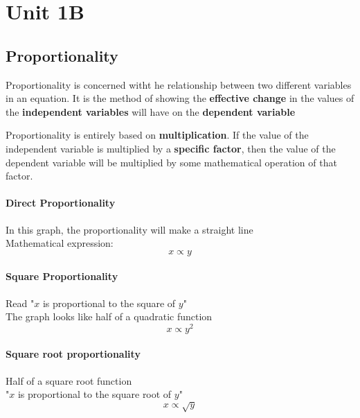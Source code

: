 \chapter{Unit 1B}

\section{Proportionality}
\begin{definition}
    Proportionality is concerned witht he relationship between two different variables in an equation. It is the method 
    of showing the \textbf{effective change} in the values of the \textbf{independent variables} will have on the \textbf{dependent variable}
\end{definition}

Proportionality is entirely based on \textbf{multiplication}. If the value of the independent variable is multiplied by a 
\textbf{specific factor}, then the value of the dependent variable will be multiplied by some mathematical operation of that factor. 

\subsubsection*{Direct Proportionality}
In this graph, the proportionality will make a straight line\\

Mathematical expression:
\[
    x \propto y
\]

\subsubsection*{Square Proportionality}
Read "$x$ is proportional to the square of $y$"\\

The graph looks like half of a quadratic function\\

\[
    x \propto y^2
\]

\subsubsection*{Square root proportionality}
Half of a square root function\\

"$x$ is proportional to the square root of $y$"\\

\[
    x \propto \sqrt{y}
\]

